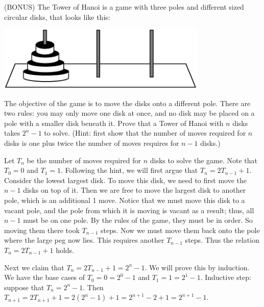 \documentclass[solution, letterpaper]{cs20inclass}
\begin{document}
\problem (BONUS) The Tower of Hanoi is a game with three poles and different sized circular disks, that looks like this:
\begin{center}
\includegraphics[width=10cm]{hanoi.jpg}
\end{center}
The objective of the game is to move the disks onto a different pole. There are two rules: you may only move one disk at once, and no disk may be placed on a pole with a smaller disk beneath it. Prove that a Tower of Hanoi with $n$ disks takes $2^n-1$ to solve. (Hint: first show that the number of moves required for $n$ disks is one plus twice the number of moves requires for $n-1$ disks.)
\begin{solution}

Let $T_n$ be the number of moves required for $n$ disks to solve the game. Note that $T_0 = 0$ and $T_1 = 1$. Following the hint, we will first argue that $T_n = 2T_{n-1} + 1$. Consider the lowest largest disk. To move this disk, we need to first move the $n-1$ disks on top of it. Then we are free to move the largest disk to another pole, which is an additional 1 move. Notice that we must move this disk to a vacant pole, and the pole from which it is moving is vacant as a result; thus, all $n-1$ must be on one pole. By the rules of the game, they must be in order. So moving them there took $T_{n-1}$ steps. Now we must move them back onto the pole where the large peg now lies. This requires another $T_{n-1}$ steps. Thus the relation $T_n = 2T_{n-1} + 1$ holds.

Next we claim that $T_n = 2T_{n-1} + 1 = 2^n-1$. We will prove this by induction. We have the base cases of $T_0 = 0 = 2^0-1$ and $T_1 = 1 = 2^1 - 1$. Inductive step: suppose that  $T_n = 2^n-1$. Then $T_{n+1} = 2T_{n+1}+1 = 2(2^n-1)+1 = 2^{n+1} - 2  + 1 = 2^{n+1}-1$.
 
\end{solution}
\end{document}
